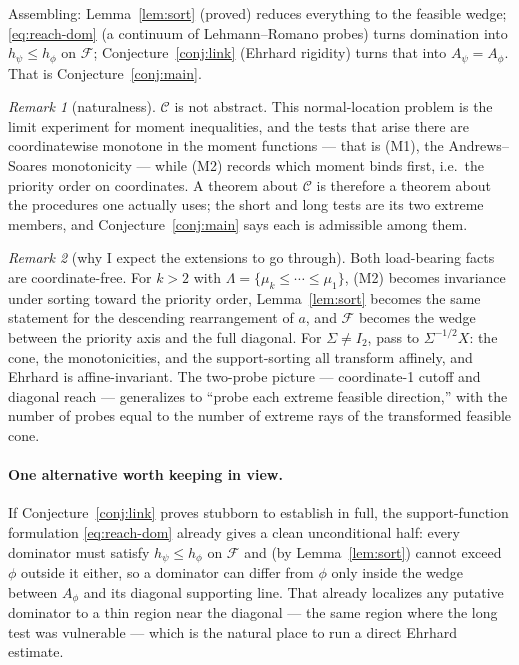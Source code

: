 \documentclass[12pt]{article}
\theoremstyle{definition}
\theoremstyle{remark}
\newtheorem{remark}{Remark}
\newcommand{\Lam}{\Lambda}
\newcommand{\Cclass}{\mathcal C}
\newcommand{\Feas}{\mathcal F}
\begin{document}
Assembling: Lemma~\ref{lem:sort} (proved) reduces everything to the feasible wedge; \eqref{eq:reach-dom} (a continuum of Lehmann--Romano probes) turns domination into $h_\psi\le h_\phi$ on $\Feas$; Conjecture~\ref{conj:link} (Ehrhard rigidity) turns that into $A_\psi=A_\phi$. That is Conjecture~\ref{conj:main}.

\begin{remark}[naturalness]
$\Cclass$ is not abstract. This normal-location problem is the limit experiment for moment inequalities, and the tests that arise there are coordinatewise monotone in the moment functions --- that is (M1), the Andrews--Soares monotonicity --- while (M2) records which moment binds first, i.e.\ the priority order on coordinates. A theorem about $\Cclass$ is therefore a theorem about the procedures one actually uses; the short and long tests are its two extreme members, and Conjecture~\ref{conj:main} says each is admissible among them.
\end{remark}

\begin{remark}[why I expect the extensions to go through]
Both load-bearing facts are coordinate-free. For $k>2$ with $\Lam=\{\mu_k\le\cdots\le\mu_1\}$, (M2) becomes invariance under sorting toward the priority order, Lemma~\ref{lem:sort} becomes the same statement for the descending rearrangement of $a$, and $\Feas$ becomes the wedge between the priority axis and the full diagonal. For $\Sigma\ne I_2$, pass to $\Sigma^{-1/2}X$: the cone, the monotonicities, and the support-sorting all transform affinely, and Ehrhard is affine-invariant. The two-probe picture --- coordinate-1 cutoff and diagonal reach --- generalizes to ``probe each extreme feasible direction,'' with the number of probes equal to the number of extreme rays of the transformed feasible cone.
\end{remark}

\paragraph{One alternative worth keeping in view.} If Conjecture~\ref{conj:link} proves stubborn to establish in full, the support-function formulation \eqref{eq:reach-dom} already gives a clean unconditional half: every dominator must satisfy $h_\psi\le h_\phi$ on $\Feas$ and (by Lemma~\ref{lem:sort}) cannot exceed $\phi$ outside it either, so a dominator can differ from $\phi$ only inside the wedge between $A_\phi$ and its diagonal supporting line. That already localizes any putative dominator to a thin region near the diagonal --- the same region where the long test was vulnerable --- which is the natural place to run a direct Ehrhard estimate.
\end{document}
